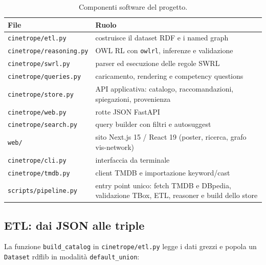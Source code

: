 \documentclass[a4paper,11pt]{article}
\newcommand{\code}[1]{\texttt{#1}}
\begin{document}
\begin{table}[ht]
\centering
\caption{Componenti software del progetto.}
\label{tab:moduli}
\small
\begin{tabular}{@{}lp{10.4cm}@{}}
\toprule
\textbf{File} & \textbf{Ruolo} \\
\midrule
\code{cinetrope/etl.py} & costruisce il dataset RDF e i named graph \\
\code{cinetrope/reasoning.py} & OWL RL con \code{owlrl}, inferenze e validazione \\
\code{cinetrope/swrl.py} & parser ed esecuzione delle regole SWRL \\
\code{cinetrope/queries.py} & caricamento, rendering e competency questions \\
\code{cinetrope/store.py} & API applicativa: catalogo, raccomandazioni, spiegazioni, provenienza \\
\code{cinetrope/web.py} & rotte JSON FastAPI \\
\code{cinetrope/search.py} & query builder con filtri e autosuggest \\
\code{web/} & sito Next.js 15 / React 19 (poster, ricerca, grafo vis-network) \\
\code{cinetrope/cli.py} & interfaccia da terminale \\
\code{cinetrope/tmdb.py} & client TMDB e importazione keyword/cast \\
\code{scripts/pipeline.py} & entry point unico: fetch TMDB e DBpedia, validazione TBox, ETL, reasoner e build dello store \\
\bottomrule
\end{tabular}
\end{table}

\subsection{ETL: dai JSON alle triple}

La funzione \code{build\_catalog} in \code{cinetrope/etl.py} legge i dati
grezzi e popola un \code{Dataset} rdflib in modalit\`a \code{default\_union}:
\end{document}
